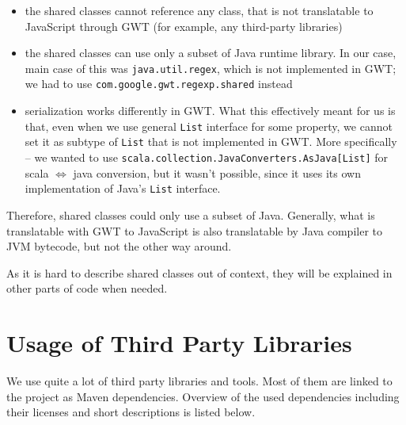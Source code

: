 \begin{itemize}
\item the shared classes cannot reference any class, that is not translatable to JavaScript through GWT (for example, any third-party libraries)
\item the shared classes can use only a subset of Java runtime library. In our case, main case of this was \texttt{java.util.regex}, which is not implemented in GWT; we had to use \texttt{com.google.gwt.regexp.shared} instead
\item serialization works differently in GWT. What this effectively meant for us is that, even when we use general \texttt{List} interface for some property, we cannot set it as subtype of \texttt{List} that is not implemented in GWT. More specifically -- we wanted to use \texttt{scala.collection.JavaConverters.AsJava[List]} for scala $\Leftrightarrow$ java conversion, but it wasn't possible, since it uses its own implementation of Java's \texttt{List} interface.
\end{itemize}

Therefore, shared classes could only use a subset of Java. Generally, what is translatable with GWT to JavaScript is also translatable by Java compiler to JVM bytecode, but not the other way around.

As it is hard to describe shared classes out of context, they will be explained in other parts of code when needed.

\section{Usage of Third Party Libraries}

We use quite a lot of third party libraries and tools. Most of them are linked to the project as Maven dependencies. Overview of the used dependencies including their licenses and short descriptions is listed below.


